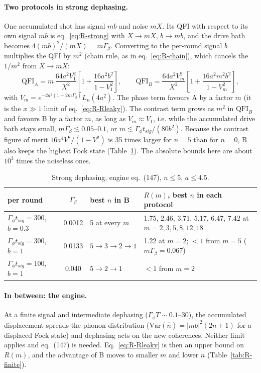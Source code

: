 \paragraph{Two protocols in strong dephasing.} One accumulated shot has signal $mb$ and noise $mX$. Its QFI with respect to its own signal $mb$ is eq.~\eqref{eq:R-strong} with $X \to mX$, $b \to mb$, and the drive bath becomes $4(mb)^2/(mX) = m\Gamma_\beta$. Converting to the per-round signal $b$ multiplies the QFI by $m^2$ (chain rule, as in eq.~\eqref{eq:R-chain}), which cancels the $1/m^2$ from $X \to mX$:
\begin{equation}
\label{eq:R-strongAB}
    \mathrm{QFI}_A = m\,\frac{64a^2V_1^2}{X^2}\left[1 + \frac{16a^2b^2}{1 - V_1^2}\right],
    \qquad
    \mathrm{QFI}_B = \frac{64a^2V_m^2}{X^2}\left[1 + \frac{16a^2m^2b^2}{1 - V_m^2}\right],
\end{equation}
with $V_m = e^{-2a^2(1 + 2m\Gamma_\beta)}L_n(4a^2)$. The phase term favours A by a factor $m$ (it is the $x \gg 1$ limit of eq.~\eqref{eq:R-Rleaky}). The contrast term grows as $m^2$ in $\mathrm{QFI}_B$ and favours B by a factor $m$, as long as $V_m \approx V_1$, i.e. while the accumulated drive bath stays small, $m\Gamma_\beta \lesssim 0.05$--$0.1$, or $m \lesssim \Gamma_\phi t_{sig}/(80b^2)$. Because the contrast figure of merit $16a^4V^2/(1 - V^2)$ is 35 times larger for $n = 5$ than for $n = 0$, B also keeps the highest Fock state (Table~\ref{tab:R-strong}). The absolute bounds here are about $10^3$ times the noiseless ones.

\begin{table}[h]
\centering
\begin{tabular}{p{3.4cm} c p{3.6cm} p{6.0cm}}
\hline
per round & $\Gamma_\beta$ & best $n$ in B & $R(m)$, best $n$ in each protocol \\
\hline
$\Gamma_\phi t_{sig} = 300$, $b = 0.3$ & 0.0012 & 5 at every $m$ & 1.75, 2.46, 3.71, 5.17, 6.47, 7.42 at $m = 2, 3, 5, 8, 12, 18$ \\
$\Gamma_\phi t_{sig} = 300$, $b = 1$ & 0.0133 & $5 \to 3 \to 2 \to 1$ & 1.22 at $m = 2$; $< 1$ from $m = 5$ ($m\Gamma_\beta = 0.067$) \\
$\Gamma_\phi t_{sig} = 100$, $b = 1$ & 0.040 & $5 \to 2 \to 1$ & $< 1$ from $m = 2$ \\
\hline
\end{tabular}
\caption{Strong dephasing, engine eq.~(147), $n \le 5$, $a \le 4.5$.}
\label{tab:R-strong}
\end{table}

\paragraph{In between: the engine.} At a finite signal and intermediate dephasing ($\Gamma_\phi T \sim 0.1$--$30$), the accumulated displacement spreads the phonon distribution ($\mathrm{Var}(\hat{n}) = \vert mb\vert^2(2n+1)$ for a displaced Fock state) and dephasing acts on the new coherences. Neither limit applies and eq.~(147) is needed. Eq.~\eqref{eq:R-Rleaky} is then an upper bound on $R(m)$, and the advantage of B moves to smaller $m$ and lower $n$ (Table~\ref{tab:R-finite}).

